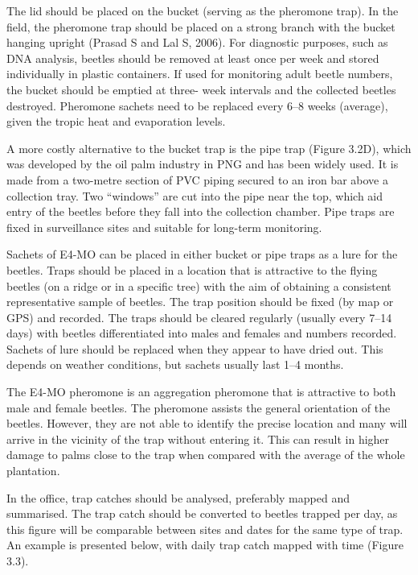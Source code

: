 \documentclass[twocolumn,letterpaper]{scrartcl}
\begin{document}
The lid should be placed on the bucket (serving as the pheromone trap). In the field, the pheromone trap 
should be placed on a strong branch with the bucket hanging upright (Prasad S and Lal S, 2006). For diagnostic 
purposes, such as DNA analysis, beetles should be removed at least once per week and stored individually 
in plastic containers. If used for monitoring adult beetle numbers, the bucket should be emptied at three-
week intervals and the collected beetles destroyed. Pheromone sachets need to be replaced every 6–8 weeks 
(average), given the tropic heat and evaporation levels.

A more costly alternative to the bucket trap is the pipe trap (Figure 3.2D), which was developed by the oil palm 
industry in PNG and has been widely used. It is made from a two-metre section of PVC piping secured to an 
iron bar above a collection tray. Two “windows” are cut into the pipe near the top, which aid entry of the beetles 
before they fall into the collection chamber. Pipe traps are fixed in surveillance sites and suitable for long-term 
monitoring. 

Sachets of E4-MO can be placed in either bucket or pipe traps as a lure for the beetles. Traps should be placed 
in a location that is attractive to the flying beetles (on a ridge or in a specific tree) with the aim of obtaining a 
consistent representative sample of beetles. The trap position should be fixed (by map or GPS) and recorded. 
The  traps  should  be  cleared  regularly  (usually  every  7–14  days)  with  beetles  differentiated  into  males  and 
females and numbers recorded. Sachets of lure should be replaced when they appear to have dried out. This 
depends on weather conditions, but sachets usually last 1–4 months. 

The E4-MO pheromone is an aggregation pheromone that is attractive to both male and female beetles. The 
pheromone assists the general orientation of the beetles. However, they are not able to identify the precise 
location and many will arrive in the vicinity of the trap without entering it. This can result in higher damage to 
palms close to the trap when compared with the average of the whole plantation.

In the office, trap catches should be analysed, preferably mapped and summarised. The trap catch should be 
converted to beetles trapped per day, as this figure will be comparable between sites and dates for the same 
type of trap. An example is presented below, with daily trap catch mapped with time (Figure 3.3). 
\end{document}
